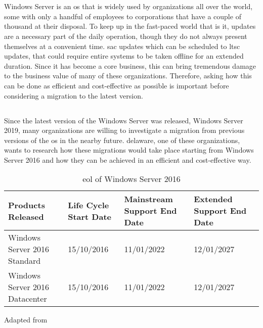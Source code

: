 \chapter{}
\label{ch:inleiding}
Windows Server is an \acrfull{os} that is widely used by organizations all over the world, some with only a handful of employees to corporations that have a couple of thousand at their disposal. 
To keep up in the fast-paced world that is \acrfull{it}, updates are a necessary part of the daily operation, though they do not always present themselves at a convenient time. 
\acrfull{sac} updates which can be scheduled to \acrfull{ltsc} updates, that could require entire systems to be taken offline for an extended duration. 
Since \acrshort{it} has become a core business, this can bring tremendous damage to the business value of many of these organizations.
Therefore, asking how this can be done as efficient and cost-effective as possible is important before considering a migration to the latest version. 

\section{}
\label{sec:probleemstelling}
Since the latest version of the Windows Server was released, Windows Server 2019, many organizations are willing to investigate a migration from previous versions of the \acrshort{os} in the nearby future. 
delaware, one of these organizations, wants to research how these migrations would take place starting from Windows Server 2016 and how they can be achieved in an efficient and cost-effective way. 

\begin{table}[htb!]
	\centering
	\begin{adjustbox}{width=1\textwidth}
		\begin{tabular}{l|l|l|ll}
			Products Released & Life Cycle Start Date & Mainstream Support End Date & Extended Support End Date &\\
			\hline
			Windows Server 2016 Standard & 15/10/2016 & 11/01/2022 & 12/01/2027 &\\
			Windows Server 2016 Datacenter & 15/10/2016 & 11/01/2022 & 12/01/2027 &\\
		\end{tabular}
	\end{adjustbox}
	\caption[\acrshort{eol} Windows Server 2016]{\acrshort{eol} of Windows Server 2016}
	\scriptsize	
	Adapted from \cite{MicrosoftEOL2019}
	\label{tab:EOL2016}
\end{table}

